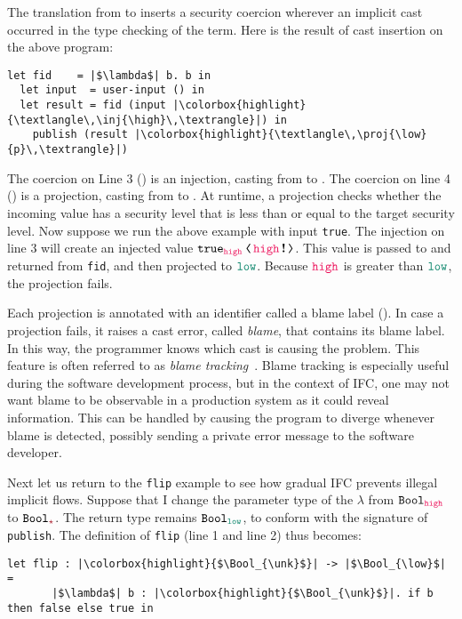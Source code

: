 The translation from \Surface to \CC inserts a security coercion wherever an
implicit cast occurred in the type checking of the \Surface term. Here is the
result of cast insertion on the above program:

\begin{lstlisting}[style=tt]
  let fid    = |$\lambda$| b. b in
  let input  = user-input () in
  let result = fid (input |\colorbox{highlight}{\textlangle\,\inj{\high}\,\textrangle}|) in
    publish (result |\colorbox{highlight}{\textlangle\,\proj{\low}{p}\,\textrangle}|)
\end{lstlisting}

The coercion on Line 3 (\inj{\high}) is an injection, casting from \high to
\unk.
%
The coercion on line 4 () is a projection, casting from \unk to
\low.
%
At runtime, a projection checks whether the incoming value has a security level
that is less than or equal to the target security level.
%
Now suppose we run the above example with input \texttt{true}. The injection on
line 3 will create an injected value $\cccast{\true_{\high}}{\inj{\high}}$. This
value is passed to and returned from \texttt{fid}, and then projected to $\low$.
Because $\high$ is greater than $\low$, the projection fails.

Each projection is annotated with an identifier called a blame label
().  In case a projection fails, it raises a cast error,
called \textit{blame}, that contains its blame label. In this way, the
programmer knows which cast is causing the problem.  This feature is
often referred to as
\textit{blame tracking}~\parencite{Findler:2002eu,Wadler:2009qv}.
Blame tracking is especially useful during the software development
process, but in the context of IFC, one may not want blame to be
observable in a production system as it could reveal information.
This can be handled by causing the program to diverge whenever blame
is detected, possibly sending a private error message to the software
developer.

Next let us return to the \texttt{flip} example to see how gradual IFC prevents
illegal implicit flows. Suppose that I change the parameter type of the
$\lambda$ from $\Bool_{\high}$ to $\Bool_{\unk}$. The return type remains
$\Bool_{\low}$, to conform with the signature of \texttt{publish}. The
definition of \texttt{flip} (line 1 and line 2) thus becomes:

\begin{lstlisting}[style=tt]
  let flip : |\colorbox{highlight}{$\Bool_{\unk}$}| -> |$\Bool_{\low}$| =
       |$\lambda$| b : |\colorbox{highlight}{$\Bool_{\unk}$}|. if b then false else true in
\end{lstlisting}

